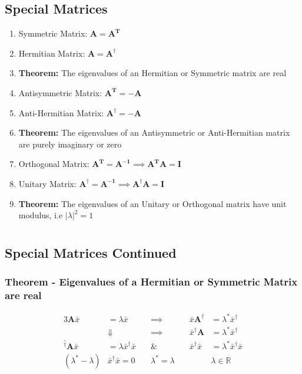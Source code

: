 \documentclass[a4paper, 11pt, normalem]{report}
\newcommand\R{\mathbb{R}}
\begin{document}
\section{Special Matrices}
\begin{enumerate}
    \item Symmetric Matrix: $\mathbf{A} = \mathbf{A^T}$
    \item Hermitian Matrix: $\mathbf{A} = \mathbf{A^{\dagger}}$
    \item[] \textbf{Theorem:} The eigenvalues of an Hermitian or Symmetric matrix are real
    \item Antisymmetric Matrix: $\mathbf{A^T} = -\mathbf{A}$
    \item Anti-Hermitian Matrix: $\mathbf{A^{\dagger}} = -\mathbf{A}$
    \item[] \textbf{Theorem:} The eigenvalues of an Antisymmetric or Anti-Hermitian matrix are purely imaginary or zero
    \item Orthogonal Matrix: $\mathbf{A^T} = \mathbf{A^{-1}} \implies \mathbf{A^{T}A} = \mathbf{I}$
    \item Unitary Matrix: $\mathbf{A^{\dagger}} = \mathbf{A^{-1}} \implies \mathbf{A^{\dagger}A} = \mathbf{I}$
    \item[] \textbf{Theorem:} The eigenvalues of an Unitary or Orthogonal matrix have unit modulus, i.e $|\lambda|^{2} = 1$
\end{enumerate}

\chapter{}
\section{Special Matrices Continued}
\subsection{Theorem - Eigenvalues of a Hermitian or Symmetric Matrix are real}
\vspace{-20pt}
\begin{alignat*}{3}
    \mathbf{A}\bar{x} &= \lambda\bar{x} \quad& \implies \quad& \bar{x}\mathbf{A^{\dagger}} &= \lambda^{*}\bar{x}^{\dagger} \\
    & \Downarrow \quad& \implies \quad& \bar{x}^{\dagger}\mathbf{A} &= \lambda^{*}\bar{x}^\dagger \\
    \bar{^\dagger}\mathbf{A}\bar{x} &= \lambda\bar{x}^\dagger \bar{x} \quad& \& \quad& \bar{x}^\dagger \bar{x} &= \lambda^{*}\bar{x}^\dagger \bar{x} \\
    (\lambda^{*} - \lambda)&\bar{x}^{\dagger}\bar{x} = 0 \quad& \lambda^* = \lambda \quad& &\lambda \in \R
\end{alignat*}
\end{document}
